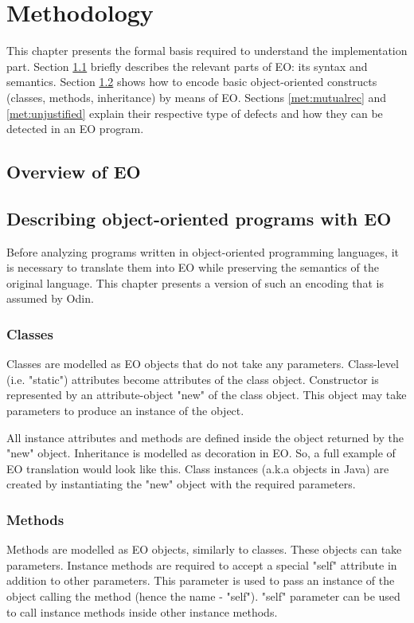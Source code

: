 \chapter{Methodology}
\label{chap:met}
This chapter presents the formal basis required to understand the implementation part. Section \ref{met:eo} briefly describes the relevant parts of EO: its syntax and semantics. Section \ref{met:encoding} shows how to encode basic object-oriented constructs (classes, methods, inheritance) by means of EO. Sections \ref{met:mutualrec} and \ref{met:unjustified} explain their respective type of defects and how they can be detected in an EO program. 

\section{Overview of EO}
\label{met:eo}

\section{Describing object-oriented programs with EO}
\label{met:encoding}
Before analyzing programs written in object-oriented programming languages, it is necessary to translate them into EO while preserving the semantics of the original language. This chapter presents a version of such an encoding that is assumed by Odin.

\subsection{Classes}
Classes are modelled as EO objects that do not take any parameters. Class-level (i.e. "static") attributes become attributes of the class object. Constructor is represented by an attribute-object "new" of the class object. This object may take parameters to produce an instance of the object.

All instance attributes and methods are defined inside the object returned by the "new" object. Inheritance is modelled as decoration in EO. So, a full example of EO translation would look like this. Class instances (a.k.a objects in Java) are created
by instantiating the "new" object with the required parameters.


\subsection{Methods}
Methods are modelled as EO objects, similarly to classes. These objects can take parameters.
Instance methods are required to accept a special "self" attribute in addition to other parameters. This parameter is used to pass an instance of the object calling the method (hence the name - "self"). 
"self" parameter can be used to call instance methods inside other instance methods.

